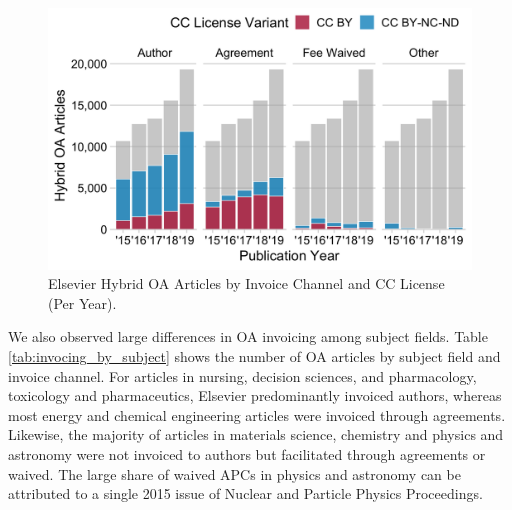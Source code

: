 \documentclass[a4paper,man,floatsintext,longtable,noextraspace,12pt]{apa6}
\begin{document}
\begin{figure}[H]

{\centering \includegraphics[width=0.7\linewidth,]{manuscript_files/figure-latex/invoiceoverview-1} 

}

\caption{Elsevier Hybrid OA Articles by Invoice Channel and CC License (Per Year).}\label{fig:invoiceoverview}
\end{figure}

We also observed large differences in OA invoicing among subject fields.
Table \ref{tab:invocing_by_subject} shows the number of OA articles by
subject field and invoice channel. For articles in nursing, decision
sciences, and pharmacology, toxicology and pharmaceutics, Elsevier
predominantly invoiced authors, whereas most energy and chemical
engineering articles were invoiced through agreements. Likewise, the
majority of articles in materials science, chemistry and physics and
astronomy were not invoiced to authors but facilitated through
agreements or waived. The large share of waived APCs in physics and
astronomy can be attributed to a single 2015 issue of Nuclear and
Particle Physics Proceedings.
\end{document}
